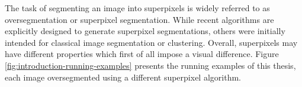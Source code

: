 The task of segmenting an image into superpixels is widely referred to as oversegmentation or superpixel segmentation. While recent algorithms are explicitly designed to generate superpixel segmentations, others were initially intended for classical image segmentation or clustering. Overall, superpixels may have different properties which first of all impose a visual difference. Figure \ref{fig:introduction-running-examples} presents the running examples of this thesis, each image oversegmented using a different superpixel algorithm.

